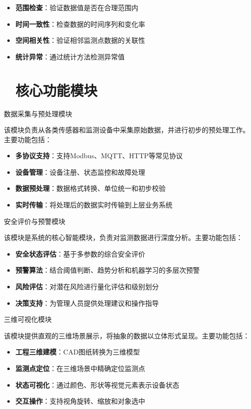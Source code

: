 \begin{itemize}
\tightlist
\item
  \textbf{范围检查}：验证数据值是否在合理范围内
\item
  \textbf{时间一致性}：检查数据的时间序列和变化率
\item
  \textbf{空间相关性}：验证相邻监测点数据的关联性
\item
  \textbf{统计异常}：通过统计方法检测异常值

  \section{核心功能模块}
\end{itemize}

 数据采集与预处理模块

该模块负责从各类传感器和监测设备中采集原始数据，并进行初步的预处理工作。主要功能包括：

\begin{itemize}
\tightlist
\item
  \textbf{多协议支持}：支持Modbus、MQTT、HTTP等常见协议
\item
  \textbf{设备管理}：设备注册、状态监控和故障处理
\item
  \textbf{数据预处理}：数据格式转换、单位统一和初步校验
\item
  \textbf{实时传输}：将处理后的数据实时传输到上层业务系统
\end{itemize}

 安全评价与预警模块

该模块是系统的核心智能模块，负责对监测数据进行深度分析。主要功能包括：

\begin{itemize}
\tightlist
\item
  \textbf{安全状态评估}：基于多参数的综合安全评价
\item
  \textbf{预警算法}：结合阈值判断、趋势分析和机器学习的多层次预警
\item
  \textbf{风险评估}：对潜在风险进行量化评估和级别划分
\item
  \textbf{决策支持}：为管理人员提供处理建议和操作指导
\end{itemize}

 三维可视化模块

该模块提供直观的三维场景展示，将抽象的数据以立体形式呈现。主要功能包括：

\begin{itemize}
\tightlist
\item
  \textbf{工程三维建模}：CAD图纸转换为三维模型
\item
  \textbf{监测点定位}：在三维场景中精确定位监测点
\item
  \textbf{状态可视化}：通过颜色、形状等视觉元素表示设备状态
\item
  \textbf{交互操作}：支持视角旋转、缩放和对象选中
\end{itemize}


